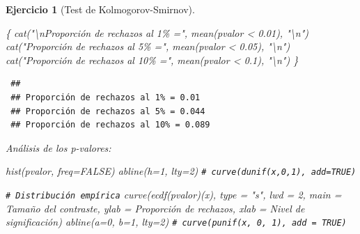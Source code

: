 \documentclass[
]{book}
\newenvironment{Shaded}{\begin{snugshade}}{\end{snugshade}}
\newcommand{\AttributeTok}[1]{\textcolor[rgb]{0.77,0.63,0.00}{#1}}
\newcommand{\CommentTok}[1]{\textcolor[rgb]{0.56,0.35,0.01}{\textit{#1}}}
\newcommand{\ConstantTok}[1]{\textcolor[rgb]{0.00,0.00,0.00}{#1}}
\newcommand{\DecValTok}[1]{\textcolor[rgb]{0.00,0.00,0.81}{#1}}
\newcommand{\FloatTok}[1]{\textcolor[rgb]{0.00,0.00,0.81}{#1}}
\newcommand{\FunctionTok}[1]{\textcolor[rgb]{0.00,0.00,0.00}{#1}}
\newcommand{\NormalTok}[1]{#1}
\newcommand{\SpecialCharTok}[1]{\textcolor[rgb]{0.00,0.00,0.00}{#1}}
\newcommand{\StringTok}[1]{\textcolor[rgb]{0.31,0.60,0.02}{#1}}
\theoremstyle{break}
\newtheorem{exercise}{Ejercicio}[chapter]
\theoremstyle{nonumberplain}
\renewcommand{\CommentTok}[1]{\textcolor[rgb]{0.41,0.41,0.41}{\texttt{#1}}}
\begin{document}
\begin{exercise}[Test de Kolmogorov-Smirnov]
\begin{enumerate}
\begin{Shaded}
\begin{Highlighting}[]
\NormalTok{\{}
  \FunctionTok{cat}\NormalTok{(}\StringTok{"}\SpecialCharTok{\textbackslash{}n}\StringTok{Proporción de rechazos al 1\% ="}\NormalTok{, }\FunctionTok{mean}\NormalTok{(pvalor }\SpecialCharTok{\textless{}} \FloatTok{0.01}\NormalTok{), }\StringTok{"}\SpecialCharTok{\textbackslash{}n}\StringTok{"}\NormalTok{)}
  \FunctionTok{cat}\NormalTok{(}\StringTok{"Proporción de rechazos al 5\% ="}\NormalTok{, }\FunctionTok{mean}\NormalTok{(pvalor }\SpecialCharTok{\textless{}} \FloatTok{0.05}\NormalTok{), }\StringTok{"}\SpecialCharTok{\textbackslash{}n}\StringTok{"}\NormalTok{)}
  \FunctionTok{cat}\NormalTok{(}\StringTok{"Proporción de rechazos al 10\% ="}\NormalTok{, }\FunctionTok{mean}\NormalTok{(pvalor }\SpecialCharTok{\textless{}} \FloatTok{0.1}\NormalTok{), }\StringTok{"}\SpecialCharTok{\textbackslash{}n}\StringTok{"}\NormalTok{)}
\NormalTok{\}}
\end{Highlighting}
\end{Shaded}

\begin{verbatim}
 ## 
 ## Proporción de rechazos al 1% = 0.01 
 ## Proporción de rechazos al 5% = 0.044 
 ## Proporción de rechazos al 10% = 0.089
\end{verbatim}

  Análisis de los p-valores:

\begin{Shaded}
\begin{Highlighting}[]
\FunctionTok{hist}\NormalTok{(pvalor, }\AttributeTok{freq=}\ConstantTok{FALSE}\NormalTok{)}
\FunctionTok{abline}\NormalTok{(}\AttributeTok{h=}\DecValTok{1}\NormalTok{, }\AttributeTok{lty=}\DecValTok{2}\NormalTok{)   }\CommentTok{\# curve(dunif(x,0,1), add=TRUE)}

\CommentTok{\# Distribución empírica}
\FunctionTok{curve}\NormalTok{(}\FunctionTok{ecdf}\NormalTok{(pvalor)(x), }\AttributeTok{type =} \StringTok{"s"}\NormalTok{, }\AttributeTok{lwd =} \DecValTok{2}\NormalTok{, }\AttributeTok{main =} \StringTok{\textquotesingle{}Tamaño del contraste\textquotesingle{}}\NormalTok{, }
      \AttributeTok{ylab =} \StringTok{\textquotesingle{}Proporción de rechazos\textquotesingle{}}\NormalTok{, }\AttributeTok{xlab =} \StringTok{\textquotesingle{}Nivel de significación\textquotesingle{}}\NormalTok{)}
\FunctionTok{abline}\NormalTok{(}\AttributeTok{a=}\DecValTok{0}\NormalTok{, }\AttributeTok{b=}\DecValTok{1}\NormalTok{, }\AttributeTok{lty=}\DecValTok{2}\NormalTok{)   }\CommentTok{\# curve(punif(x, 0, 1), add = TRUE)}
\end{Highlighting}
\end{Shaded}


\end{enumerate}
\end{exercise}
\end{document}
